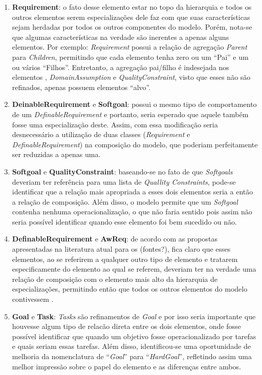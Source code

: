 \begin{enumerate}
	\item \textbf{Requirement}: o fato desse elemento estar no topo da hierarquia e todos os outros elementos serem especializações dele faz com que suas características sejam herdadas por todos os outros componentes do modelo. Porém, nota-se que algumas características na verdade são inerentes a apenas alguns elementos. Por exemplo: \textit{Requirement} possui a relação de agregação \textit{Parent} para \textit{Children}, permitindo que cada elemento tenha zero ou um ``Pai'' e um ou vários ``Filhos''. Entretanto, a agregação pai/filho é indesejada nos elementos \awreq, \textit{DomainAssumption} e \textit{QualityConstraint}, visto que esses não são refinados, apenas possuem elementos ``alvo''. \label{p1}
	
	\item \textbf{DeinableRequirement} e \textbf{Softgoal}: \sofgoal possui o mesmo tipo de comportamento de um \textit{DefinableRequirement} e portanto, seria esperado que aquele também fosse uma especialização deste. Assim, com essa modificação seria desnecessário a utilização de duas classes (\textit{Requirement} e \textit{DefinableRequirement}) na composição do modelo, que poderiam perfeitamente ser reduzidas a apenas uma. \label{p2}
	
	\item \textbf{Softgoal} e \textbf{QualityConstraint}: baseando-se no fato de que \textit{Softgoals} deveriam ter referência para uma lista de \textit{Quallity Constraints}, pode-se identificar que a relação mais apropriada a esses dois elementos seria a então a relação de composição. Além disso, o modelo permite que um \textit{Softgoal} contenha nenhuma operacionalização, o que não faria sentido pois assim não seria possível identificar quando esse elemento foi bem sucedido ou não. \label{p3}
	
	\item \textbf{DefinableRequirement} e \textbf{AwReq}: de acordo com as propostas apresentadas na literatura atual para os \awreqs (fontes?), fica claro que esses elementos, ao se referirem a qualquer outro tipo de elemento e tratarem especificamente do elemento ao qual se referem, deveriam ter na verdade uma relação de composição com o elemento mais alto da hierarquia de especializações, permitindo então que todos os outros elementos do modelo contivessem \awreqs. \label{p4}
	
	\item \textbf{Goal} e \textbf{Task}: \textit{Tasks} são refinamentos de \textit{Goal} e por isso seria importante que houvesse algum tipo de relacão direta entre os dois elementos, onde fosse possível identificar que quando um objetivo fosse operacionalizado por tarefas e quais seriam essas tarefas. Além disso, identificou-se uma oportunidade de melhoria da nomenclatura de ``\textit{Goal}'' para ``\textit{HardGoal}'', refletindo assim uma melhor impressão sobre o papel do elemento e as diferenças entre ambos. \label{p5}
	

\end{enumerate}
